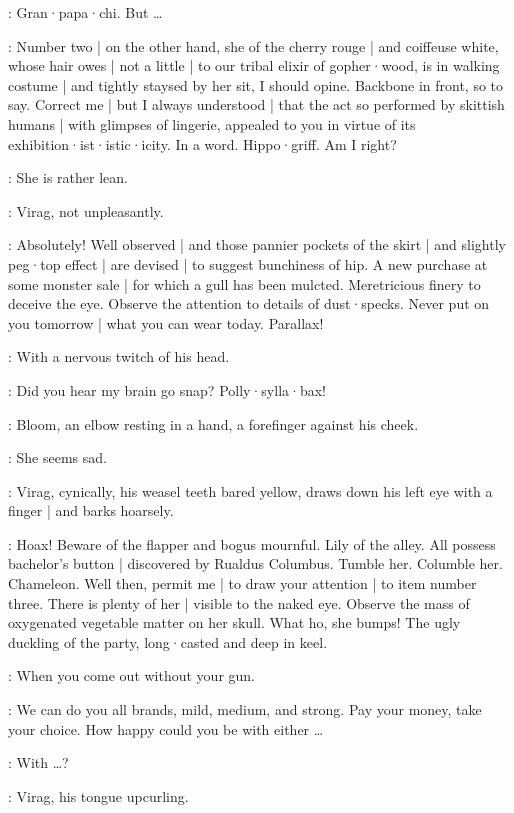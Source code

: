 \Bloom:
Gran·papa·chi.
But \ldots

\Virag:
Number two |
on the other hand,
she of the cherry rouge |
and coiffeuse white,%
whose hair owes |
not a little |
to our tribal elixir of gopher·wood,
is in walking costume |
and tightly staysed by her sit,
I should opine.
Backbone in front,
so to say.
Correct me |
but I always understood |
that the act so performed by skittish humans |
with glimpses of lingerie,
appealed to you in virtue of its exhibition·ist·istic·icity.
In a word.
Hippo·griff.
Am I right?

\Bloom:
She is rather lean.

:
Virag,
not unpleasantly.

\Virag:
Absolutely!
Well observed |
and those pannier pockets of the skirt |
and slightly peg·top effect |
are devised |
to suggest bunchiness of hip.
A new purchase at some monster sale |
for which a gull has been mulcted.
Meretricious finery to deceive the eye.
Observe the attention to details of dust·specks.
Never put on you tomorrow |
what you can wear today.
Parallax!

:
With a nervous twitch of his head.

\Virag:
Did you hear my brain go snap?
Polly·sylla·bax!

:
Bloom,
an elbow resting in a hand,
a forefinger against his cheek.

\Bloom:
She seems sad.

:
Virag,
cynically,
his weasel teeth bared yellow,
draws down his left eye with a finger |
and barks hoarsely.

\Virag:
Hoax!
Beware of the flapper and bogus mournful.
Lily of the alley.
All possess bachelor's button |
discovered by Rualdus Columbus.
Tumble her.
Columble her.
Chameleon.
Well then,
permit me |
to draw your attention |
to item number three.
There is plenty of her |
visible to the naked eye.
Observe the mass of oxygenated vegetable matter on her skull.
What ho,
she bumps!
The ugly duckling of the party,
long·casted and deep in keel.

\Bloom:
When you come out without your gun.

\Virag:
We can do you all brands,
mild,
medium,
and strong.
Pay your money,
take your choice.
How happy could you be with either \ldots

\Bloom:
With \ldots?

:
Virag,
his tongue upcurling.

